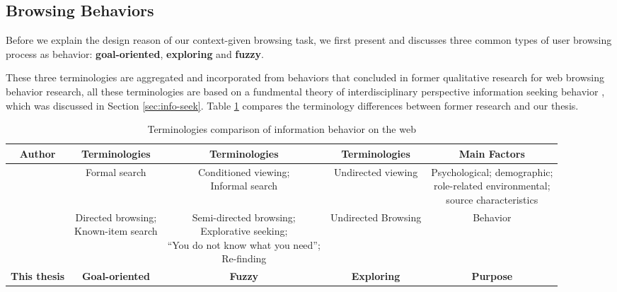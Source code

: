 


\subsection{Browsing Behaviors}
\label{sec:behavior}

Before we explain the design reason of our context-given browsing task, 
we first present and discusses three common types of user browsing process as behavior: \textbf{goal-oriented}, 
\textbf{exploring} and \textbf{fuzzy}.

These three terminologies are aggregated and incorporated from behaviors that concluded 
in former qualitative research for web browsing behavior research, 
all these terminologies are based on a fundmental theory of 
interdisciplinary perspective information seeking behavior \cite{wilson1997information},
which was discussed in Section \ref{sec:info-seek}.
Table \ref{table:info-seek} compares the terminology differences between former research and our thesis.

\begin{table}[H]
    \small
    \centering
    \caption{Terminologies comparison of information behavior on the web}
    \begin{adjustbox}{width=\textwidth}
        \begin{tabular}{ccccc}
            \toprule
            \textbf{Author} & \textbf{Terminologies} & \textbf{Terminologies} & \textbf{Terminologies} & \textbf{Main Factors} \\
            \hline
            \cite{choo1999information} & Formal search & \makecell{Conditioned viewing; \\ Informal search} & Undirected viewing & \makecell{Psychological; demographic;\\ role-related environmental; \\source characteristics} \\
            \cite{johnson2017patterns} & \makecell{Directed browsing; \\Known-item search} & \makecell{Semi-directed browsing; \\Explorative seeking; \\``You do not know what you need''; \\Re-finding} & Undirected Browsing & Behavior \\
            \textbf{This thesis} & \textbf{Goal-oriented} & \textbf{Fuzzy} & \textbf{Exploring} & \textbf{Purpose} \\
            \bottomrule
        \end{tabular}
        \label{table:info-seek}
    \end{adjustbox}
\end{table}

